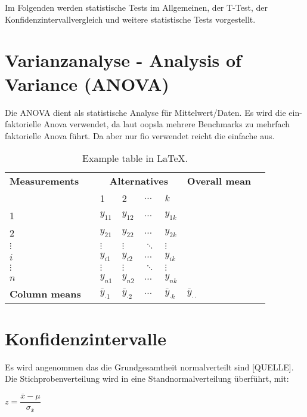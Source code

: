 Im Folgenden werden statistische Tests im
Allgemeinen, der T-Test, der Konfidenzintervallvergleich und weitere statistische Tests
vorgestellt.

\section{Varianzanalyse - Analysis of Variance (ANOVA)}

Die ANOVA dient als statistische Analyse für Mittelwert/Daten.
Es wird die ein-faktorielle Anova verwendet, da laut oopsla mehrere Benchmarks zu mehrfach faktorielle Anova führt.
Da aber nur fio verwendet reicht die einfache aus.

\begin{table}
  \centering
  \begin{tabularx}{\linewidth}{|XX|XXXX|XX}
  \toprule
  \textbf{Measurements} & & \multicolumn{4}{c|}{\textbf{Alternatives}} & \textbf{Overall mean} \\
  \cmidrule(lr){3-6}
  & & 1 & 2 & $\dots$ & $k$ & \\
  \midrule
  1 & & $y_{11}$ & $y_{12}$ & $\dots$ & $y_{1k}$ & \\
  2 & & $y_{21}$ & $y_{22}$ & $\dots$ & $y_{2k}$ & \\
  $\vdots$ & & $\vdots$ & $\vdots$ & $\ddots$ & $\vdots$ & \\
  $i$ & & $y_{i1}$ & $y_{i2}$ & $\dots$ & $y_{ik}$ & \\
  $\vdots$ & & $\vdots$ & $\vdots$ & $\ddots$ & $\vdots$ & \\
  $n$ & & $y_{n1}$ & $y_{n2}$ & $\dots$ & $y_{nk}$ & \\
  \midrule
  \textbf{Column means} & & $\bar{y}_{\cdot 1}$ & $\bar{y}_{\cdot 2}$ & $\dots$ & $\bar{y}_{\cdot k}$ & $\bar{y}_{\cdot \cdot}$ \\
  \bottomrule
  \end{tabularx}
  \caption{Example table in LaTeX.}
\end{table}

\section{Konfidenzintervalle}
Es wird angenommen das die Grundgesamtheit normalverteilt sind [QUELLE].
Die Stichprobenverteilung wird in eine Standnormalverteilung überführt, mit:

\begin{center}
  $z = \dfrac{\overline{x} - \mu}{\sigma_{\overline{x}}}$
\end{center}

